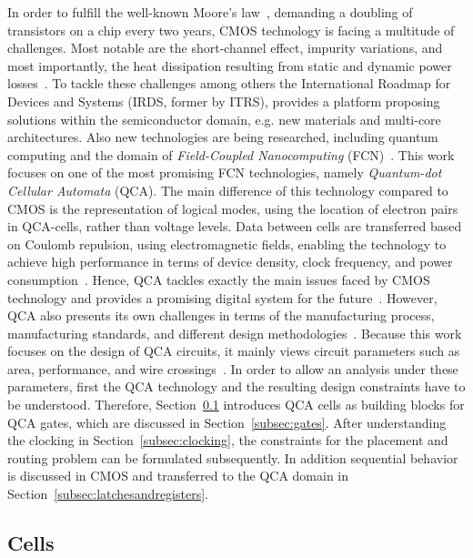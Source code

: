 In order to fulfill the well-known Moore's law~\cite{Moores_Law}, demanding a doubling of transistors on a chip every two years, CMOS technology is facing a multitude of challenges. Most notable are the short-channel effect, impurity variations, and most importantly, the heat dissipation resulting from static and dynamic power losses~\cite{challenges_1, challenges_2, challenges_3}. To tackle these challenges among others the International Roadmap for Devices and Systems (IRDS, former by ITRS), provides a platform proposing solutions within the semiconductor domain, e.g. new materials and multi-core architectures. Also new technologies are being researched, including quantum computing and the domain of \textit{Field-Coupled Nanocomputing} (FCN)~\cite{safoev2020design}. This work focuses on one of the most promising FCN technologies, namely \textit{Quantum-dot Cellular Automata} (QCA). The main difference of this technology compared to CMOS is the representation of logical modes, using the location of electron pairs in QCA-cells, rather than voltage levels. Data between cells are transferred based on Coulomb repulsion, using electromagnetic fields, enabling the technology to achieve high performance in terms of device density, clock frequency, and power consumption~\cite{mohammadi2016efficient}. Hence, QCA tackles exactly the main issues faced by CMOS technology and provides a promising digital system for the future~\cite{ahmad2018optimal}. However, QCA also presents its own challenges in terms of the manufacturing process, manufacturing standards, and different design
methodologies~\cite{Bennet_waveform}. Because this work focuses on the design of QCA circuits, it mainly views circuit parameters such as area, performance, and wire crossings~\cite{ahmad2018optimal}. In order to allow an analysis under these parameters, first the QCA technology and the resulting design constraints have to be understood. Therefore, Section~\ref{subsec:cells} introduces QCA cells as building blocks for QCA gates, which are discussed in Section~\ref{subsec:gates}. After understanding the clocking in Section~\ref{subsec:clocking}, the constraints for the placement and routing problem can be formulated subsequently. In addition sequential behavior is discussed in CMOS and transferred to the QCA domain in Section~\ref{subsec:latchesandregisters}.

\subsection{Cells}\label{subsec:cells}


